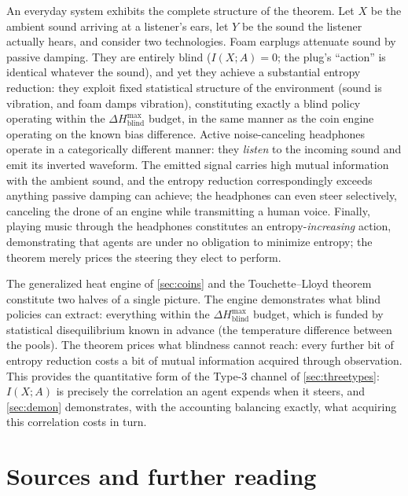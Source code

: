 \documentclass[11pt]{article}
\begin{document}
\begin{example}
\label{ex:headphones}
An everyday system exhibits the complete structure of the theorem. Let $X$ be the ambient sound arriving at a listener's ears, let $Y$ be the sound the listener actually hears, and consider two technologies. Foam earplugs attenuate sound by passive damping. They are entirely blind ($I(X;A) = 0$; the plug's ``action'' is identical whatever the sound), and yet they achieve a substantial entropy reduction: they exploit fixed statistical structure of the environment (sound is vibration, and foam damps vibration), constituting exactly a blind policy operating within the $\Delta H^{\max}_{\text{blind}}$ budget, in the same manner as the coin engine operating on the known bias difference. Active noise-canceling headphones operate in a categorically different manner: they \emph{listen} to the incoming sound and emit its inverted waveform. The emitted signal carries high mutual information with the ambient sound, and the entropy reduction correspondingly exceeds anything passive damping can achieve; the headphones can even steer selectively, canceling the drone of an engine while transmitting a human voice. Finally, playing music through the headphones constitutes an entropy-\emph{increasing} action, demonstrating that agents are under no obligation to minimize entropy; the theorem merely prices the steering they elect to perform.
\end{example}

\begin{remark}
The generalized heat engine of \cref{sec:coins} and the Touchette--Lloyd theorem constitute two halves of a single picture. The engine demonstrates what blind policies can extract: everything within the $\Delta H^{\max}_{\text{blind}}$ budget, which is funded by statistical disequilibrium known in advance (the temperature difference between the pools). The theorem prices what blindness cannot reach: every further bit of entropy reduction costs a bit of mutual information acquired through observation. This provides the quantitative form of the Type-3 channel of \cref{sec:threetypes}: $I(X;A)$ is precisely the correlation an agent expends when it steers, and \cref{sec:demon} demonstrates, with the accounting balancing exactly, what acquiring this correlation costs in turn.
\end{remark}

\section*{Sources and further reading}
\end{document}
